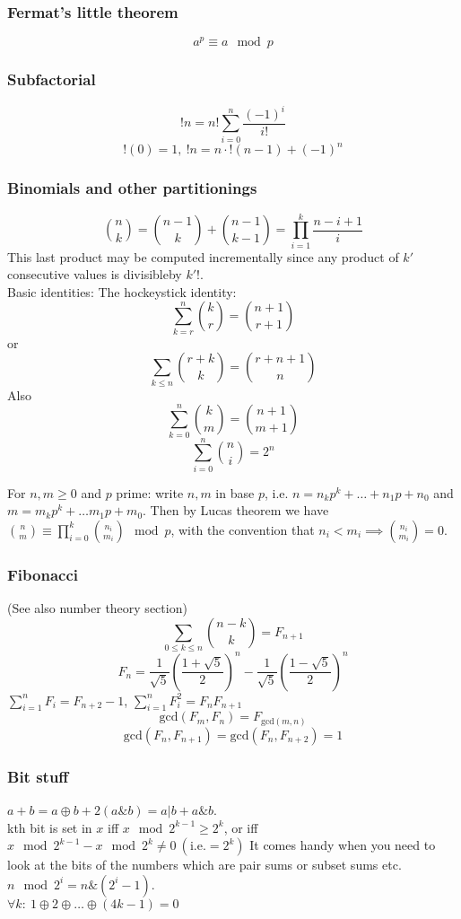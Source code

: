 \documentclass[
	a4paper,
	landscape,
	10pt,
]{article}
\begin{document}
\begin{multicols}{3}
		\subsubsection*{Fermat's little theorem}
		$$a^p \equiv a \mod p$$
		\subsubsection*{Subfactorial}
		$$!n = n! \sum_{i=0}^{n} \frac{(-1)^i}{i!}$$
		$$!(0) = 1, ~ !n = n \cdot !(n-1) + (-1)^n$$

		\subsubsection*{Binomials and other partitionings}
		$$\binom{n}{k} = \binom{n-1}{k}+\binom{n-1}{k-1} =
			\prod_{i=1}^k \frac{n-i+1}{i}$$ This last product may be computed
		incrementally since any product of $k'$ consecutive values is divisibleby
		$k'!$. \\
		Basic identities: The hockeystick identity: \\
		 $$\sum_{k=r}^n \binom{k}{r}
			= \binom{n+1}{r+1}$$
		or $$\sum_{k\leq n}\binom{r+k}{k} = \binom{r+n+1}{n}$$
		Also $$\sum_{k=0}^n \binom{k}{m} = \binom{n+1}{m+1}$$
		$$\sum_{i=0}^{n} \binom{n}{i} = 2^n$$

		For $n, m \geq 0$ and $p$ prime: write $n, m$ in base $p$, i.e.
		$n = n_k p^k + \dots + n_1 p + n_0$ and $m = m_k p^k + \dots m_1 p + m_0$. Then
		by Lucas theorem we have $\binom{n}{m} \equiv \prod_{i=0}^k \binom{n_i}{m_i}
		\mod p$, with the convention that $n_i < m_i \implies \binom{n_i}{m_i} =0$.

		\subsubsection*{Fibonacci} (See also number theory section) \\
 		$$\sum_{0 \leq k \leq n} \binom{n-k}{k} = F_{n+1}$$ 
		$$F_n = \frac{1}{\sqrt{5}} \left(\frac{1+\sqrt{5}}{2}\right)^n - \frac{1}{\sqrt{5}}\left(\frac{1-\sqrt{5}}{2}\right)^n$$
		$\sum_{i=1}^{n} {F_i} = F_{n+2}-1$, $\sum_{i=1}^{n} {F_i^2} = F_{n}F_{n+1}$
		$$\text{gcd}(F_m, F_n) = F_{\text{gcd}(m, n)}$$
		$$\text{gcd}(F_n, F_{n+1}) = \text{gcd}(F_n, F_{n+2}) = 1$$

		\subsubsection*{Bit stuff} $a + b = a \oplus b + 2(a\&b) = a | b + a\&b$. \\
		kth bit is set in $x$ iff $x \mod 2^{k-1} \geq 2^k$, or iff $x \mod 2^{k-1}  - x \mod 2^k \neq 0~(\text{i.e.} = 2^k)$ It comes handy when you need to look at the bits of the numbers which are pair sums or subset sums etc. \\
		$n \mod 2^i = n\&(2^i-1)$. \\
		$\forall k:~ 1 \oplus 2 \oplus \hdots \oplus (4k-1) = 0$


\end{multicols}
\end{document}
